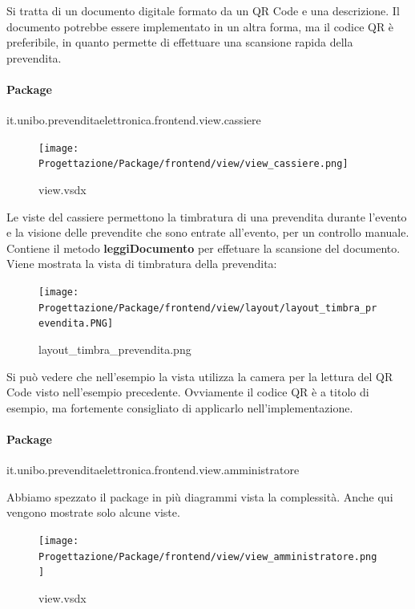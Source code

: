 \documentclass[a4paper]{article}
\begin{document}
Si tratta di un documento digitale formato da un QR Code e una descrizione. Il documento potrebbe essere implementato in un altra forma, ma il codice QR è preferibile, in quanto permette di effettuare una scansione rapida della prevendita.

\paragraph{Package} it.unibo.prevenditaelettronica.frontend.view.cassiere


\begin{figure}[H]
    \texttt{[image: Progettazione/Package/frontend/view/view\_cassiere.png]}
    \centering
    \caption{view.vsdx}
\end{figure}

Le viste del cassiere permettono la timbratura di una prevendita durante l'evento e la visione delle prevendite che sono entrate all'evento, per un controllo manuale. Contiene il metodo \textbf{leggiDocumento} per effetuare la scansione del documento. Viene mostrata la vista di timbratura della prevendita:

\begin{figure}[H]
    \texttt{[image: Progettazione/Package/frontend/view/layout/layout\_timbra\_prevendita.PNG]}
    \centering
    \caption{layout\_timbra\_prevendita.png}
\end{figure}

Si può vedere che nell'esempio la vista utilizza la camera per la lettura del QR Code visto nell'esempio precedente. Ovviamente il codice QR è a titolo di esempio, ma fortemente consigliato di applicarlo nell'implementazione.

\newpage

\paragraph{Package} it.unibo.prevenditaelettronica.frontend.view.amministratore


Abbiamo spezzato il package in più diagrammi vista la complessità. Anche qui vengono mostrate solo alcune viste.


\begin{figure}[H]
    \texttt{[image: Progettazione/Package/frontend/view/view\_amministratore.png]}
    \centering
    \caption{view.vsdx}
\end{figure}
\end{document}
